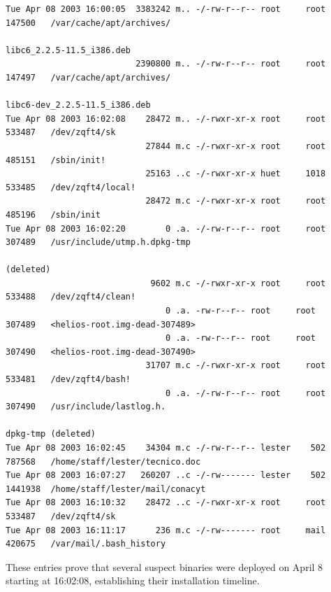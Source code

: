 {\footnotesize
\begin{lstlisting}[style=terminal]
Tue Apr 08 2003 16:00:05  3383242 m.. -/-rw-r--r-- root     root     147500   /var/cache/apt/archives/
                                                                              libc6_2.2.5-11.5_i386.deb
                          2390800 m.. -/-rw-r--r-- root     root     147497   /var/cache/apt/archives/
                                                                              libc6-dev_2.2.5-11.5_i386.deb
Tue Apr 08 2003 16:02:08    28472 m.. -/-rwxr-xr-x root     root     533487   /dev/zqft4/sk
                            27844 m.c -/-rwxr-xr-x root     root     485151   /sbin/init!
                            25163 ..c -/-rwxr-xr-x huet     1018     533485   /dev/zqft4/local!
                            28472 m.c -/-rwxr-xr-x root     root     485196   /sbin/init
Tue Apr 08 2003 16:02:20        0 .a. -/-rw-r--r-- root     root     307489   /usr/include/utmp.h.dpkg-tmp 
                                                                              (deleted)
                             9602 m.c -/-rwxr-xr-x root     root     533488   /dev/zqft4/clean!
                                0 .a. -rw-r--r-- root     root     307489   <helios-root.img-dead-307489>
                                0 .a. -rw-r--r-- root     root     307490   <helios-root.img-dead-307490>
                            31707 m.c -/-rwxr-xr-x root     root     533481   /dev/zqft4/bash!
                                0 .a. -/-rw-r--r-- root     root     307490   /usr/include/lastlog.h.
                                                                              dpkg-tmp (deleted)
Tue Apr 08 2003 16:02:45    34304 m.c -/-rw-r--r-- lester    502      787568   /home/staff/lester/tecnico.doc
Tue Apr 08 2003 16:07:27   260207 ..c -/-rw------- lester    502      1441938  /home/staff/lester/mail/conacyt
Tue Apr 08 2003 16:10:32    28472 ..c -/-rwxr-xr-x root     root     533487   /dev/zqft4/sk
Tue Apr 08 2003 16:11:17      236 m.c -/-rw------- root     mail     420675   /var/mail/.bash_history
\end{lstlisting}
}

\vspace{1em}

These entries prove that several suspect binaries were deployed on April 8 starting at 16:02:08, establishing their installation timeline.

\vspace{1em}

